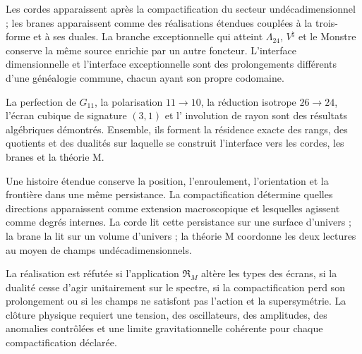 Les cordes apparaissent après la compactification du secteur undécadimensionnel ; les
branes apparaissent comme des réalisations étendues couplées à la trois-forme et à
ses duales. La branche exceptionnelle qui atteint \(\Lambda_{24}\),
\(V^\natural\) et le Monstre conserve la même source enrichie par
un autre foncteur. L'interface dimensionnelle et l'interface exceptionnelle sont des prolongements
différents d'une généalogie commune, chacun ayant son propre codomaine.

\begin{resultado}
La perfection de \(G_{11}\), la polarisation \(11\to10\), la réduction
isotrope \(26\to24\), l'écran cubique de signature \((3,1)\) et l'
involution de rayon sont des résultats algébriques démontrés. Ensemble, ils forment la
résidence exacte des rangs, des quotients et des dualités sur laquelle se construit
l'interface vers les cordes, les branes et la théorie M.
\end{resultado}

\begin{lecturafisica}
Une histoire étendue conserve la position, l'enroulement, l'orientation et la
frontière dans une même persistance. La compactification détermine quelles
directions apparaissent comme extension macroscopique et lesquelles agissent comme degrés
internes. La corde lit cette persistance sur une surface d'univers ; la
brane la lit sur un volume d'univers ; la théorie M coordonne les deux lectures
au moyen de champs undécadimensionnels.
\end{lecturafisica}

\begin{frontera}
La réalisation est réfutée si l'application \(\mathfrak R_M\) altère les types des
écrans, si la dualité cesse d'agir unitairement sur le spectre, si
la compactification perd son prolongement ou si les champs ne satisfont pas l'action et la
supersymétrie. La clôture physique requiert une tension, des oscillateurs, des amplitudes,
des anomalies contrôlées et une limite gravitationnelle cohérente pour chaque
compactification déclarée.
\end{frontera}
